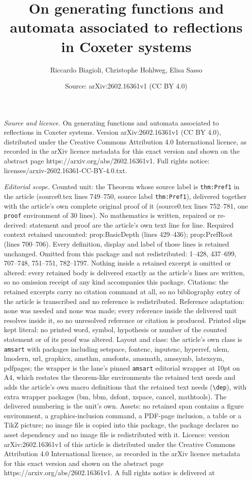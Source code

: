 \documentclass[10pt,a4paper]{amsart}
\title[On generating functions and automata associated to reflectio]{On generating functions and automata associated to reflections in Coxeter systems}
\author{Riccardo Biagioli, Christophe Hohlweg, Elisa Sasso}
\date{Source: arXiv:2602.16361v1 (CC BY 4.0)}
\begin{document}
\maketitle

\noindent\emph{Source and licence.} On generating functions and automata associated to reflections in Coxeter systems. Version arXiv:2602.16361v1 (CC BY 4.0), distributed under the Creative Commons Attribution 4.0 International licence, as recorded in the arXiv licence metadata for this exact version and shown on the abstract page https://arxiv.org/abs/2602.16361v1. Full rights notice: licenses/arxiv-2602.16361-CC-BY-4.0.txt.\par\smallskip

\noindent\textit{Editorial scope.} Counted unit: the Theorem whose source label is \texttt{thm:Pref1} in the article (source0.tex lines 749--750, source label \texttt{thm:Pref1}), delivered together with the article's own complete original proof of it (source0.tex lines 752--781, one \texttt{proof} environment of 30 lines). No mathematics is written, repaired or re-derived: statement and proof are the article's own text line for line. Required context retained uncounted: prop:BasicDepth (lines 429--436); prop:PrefRoot (lines 700--706). Every definition, display and label of those lines is retained unchanged. Omitted from this package and not redistributed: 1--428, 437--699, 707--748, 751--751, 782--1797. Nothing inside a retained excerpt is omitted or altered: every retained body is delivered exactly as the article's lines are written, so no omission receipt of any kind accompanies this package. Citations: the retained excerpts carry no citation command at all, so no bibliography entry of the article is transcribed and no reference is redistributed. Reference adaptation: none was needed and none was made; every reference inside the delivered unit resolves inside it, so no unresolved reference or citation is produced. Printed slips kept literal: no printed word, symbol, hypothesis or number of the counted statement or of its proof was altered. Layout and class: the article's own class is \texttt{amsart} with packages including setspace, fontenc, inputenc, hyperref, ulem, lmodern, url, graphicx, amsthm, amsfonts, amsmath, amssymb, latexsym, pdfpages; the wrapper is the lane's pinned \texttt{amsart} editorial wrapper at 10pt on A4, which restates the theorem-like environments the retained text needs and adds the article's own macro definitions that the retained text needs (\texttt{\textbackslash dep}), with extra wrapper packages (bm, bbm, dsfont, xspace, cancel, mathtools). The delivered numbering is the unit's own. Assets: no retained span contains a figure environment, a graphics-inclusion command, a PDF-page inclusion, a table or a TikZ picture; no image file is copied into this package, the package declares no asset dependency and no image file is redistributed with it. Licence: version arXiv:2602.16361v1 of this article is distributed under the Creative Commons Attribution 4.0 International licence, as recorded in the arXiv licence metadata for this exact version and shown on the abstract page https://arxiv.org/abs/2602.16361v1. A full rights notice is delivered at 
\end{document}

